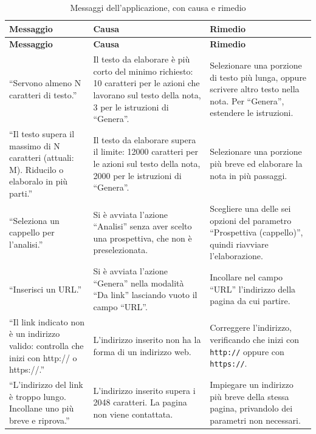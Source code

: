 \documentclass[a4paper, 10pt]{article}
\begin{document}
\begingroup
\small
\begin{longtable}{|p{4.5cm}|p{4.3cm}|p{4.3cm}|}
    \caption{Messaggi dell'applicazione, con causa e rimedio}
    \label{tab:messaggi} \\
    \hline
    \textbf{Messaggio} & \textbf{Causa} & \textbf{Rimedio} \\
    \hline
    \endfirsthead
    \hline
    \textbf{Messaggio} & \textbf{Causa} & \textbf{Rimedio} \\
    \hline
    \endhead
    ``Servono almeno N caratteri di testo.'' & Il testo da elaborare è più corto del minimo richiesto: 10 caratteri per le azioni che lavorano sul testo della nota, 3 per le istruzioni di ``Genera''. & Selezionare una porzione di testo più lunga, oppure scrivere altro testo nella nota. Per ``Genera'', estendere le istruzioni. \\ \hline

    ``Il testo supera il massimo di N caratteri (attuali: M). Riducilo o elaboralo in più parti.'' & Il testo da elaborare supera il limite: 12000 caratteri per le azioni sul testo della nota, 2000 per le istruzioni di ``Genera''. & Selezionare una porzione più breve ed elaborare la nota in più passaggi. \\ \hline

    ``Seleziona un cappello per l'analisi.'' & Si è avviata l'azione ``Analisi'' senza aver scelto una prospettiva, che non è preselezionata. & Scegliere una delle sei opzioni del parametro ``Prospettiva (cappello)'', quindi riavviare l'elaborazione. \\ \hline

    ``Inserisci un URL.'' & Si è avviata l'azione ``Genera'' nella modalità ``Da link'' lasciando vuoto il campo ``URL''. & Incollare nel campo ``URL'' l'indirizzo della pagina da cui partire. \\ \hline

    ``Il link indicato non è un indirizzo valido: controlla che inizi con http:// o https://.'' & L'indirizzo inserito non ha la forma di un indirizzo web. & Correggere l'indirizzo, verificando che inizi con \texttt{http://} oppure con \texttt{https://}. \\ \hline

    ``L'indirizzo del link è troppo lungo. Incollane uno più breve e riprova.'' & L'indirizzo inserito supera i 2048 caratteri. La pagina non viene contattata. & Impiegare un indirizzo più breve della stessa pagina, privandolo dei parametri non necessari. \\ \hline


\end{longtable}
\end{document}
